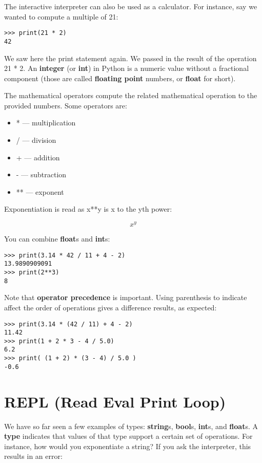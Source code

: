 The interactive interpreter can also be used as a calculator. For
instance, say we wanted to compute a multiple of 21:

\begin{verbatim}
>>> print(21 * 2)
42
\end{verbatim}

We saw here the print statement again. We passed in the result of the
operation 21 * 2. An \textbf{integer} (or \textbf{int}) in Python is a
numeric value without a fractional component (those are called
\textbf{floating point} numbers, or \textbf{float} for short).

The mathematical operators compute the related mathematical operation to
the provided numbers. Some operators are:

\begin{itemize}
\tightlist
\item
  * --- multiplication
\item
  / --- division
\item
  + --- addition
\item
  - --- subtraction
\item
  ** --- exponent
\end{itemize}

Exponentiation is read as x**y is x to the yth power:

\[x^y\]

You can combine \textbf{float}s and \textbf{int}s:

\begin{verbatim}
>>> print(3.14 * 42 / 11 + 4 - 2)
13.9890909091
>>> print(2**3)
8
\end{verbatim}

Note that \textbf{operator precedence} is important. Using parenthesis
to indicate affect the order of operations gives a difference results,
as expected:

\begin{verbatim}
>>> print(3.14 * (42 / 11) + 4 - 2)
11.42
>>> print(1 + 2 * 3 - 4 / 5.0)
6.2
>>> print( (1 + 2) * (3 - 4) / 5.0 )
-0.6
\end{verbatim}

\section{REPL (Read Eval Print Loop)}\label{repl-read-eval-print-loop}

We have so far seen a few examples of types: \textbf{string}s,
\textbf{bool}s, \textbf{int}s, and \textbf{float}s. A \textbf{type}
indicates that values of that type support a certain set of operations.
For instance, how would you exponentiate a string? If you ask the
interpreter, this results in an error:

